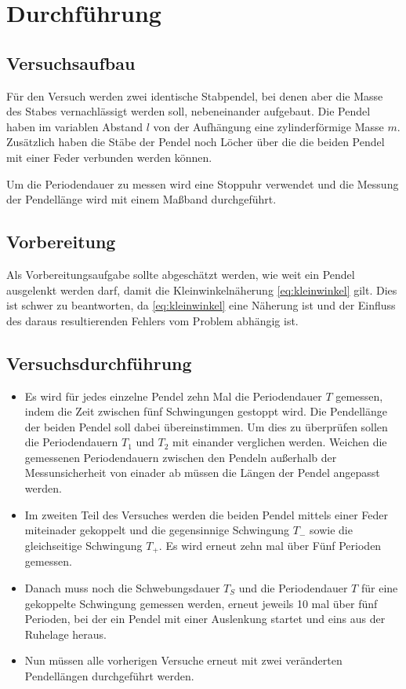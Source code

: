 \section{Durchführung}
\label{sec:Durchführung}
\subsection{Versuchsaufbau}
Für den Versuch werden zwei identische Stabpendel, bei denen aber die Masse des Stabes vernachlässigt werden soll, nebeneinander aufgebaut. Die Pendel haben im variablen Abstand $l$ von der Aufhängung eine zylinderförmige Masse $m$.
Zusätzlich haben die Stäbe der Pendel noch Löcher über die die beiden Pendel mit einer Feder verbunden werden können.

Um die Periodendauer zu messen wird eine Stoppuhr verwendet und die Messung der Pendellänge wird mit einem Maßband durchgeführt.
\subsection{Vorbereitung}
\label{sec:Vorbereitung}

Als Vorbereitungsaufgabe sollte abgeschätzt werden, wie weit ein Pendel ausgelenkt werden darf, damit die Kleinwinkelnäherung \eqref{eq:kleinwinkel}
gilt. Dies ist schwer zu beantworten, da \eqref{eq:kleinwinkel} eine Näherung ist und der Einfluss des daraus resultierenden Fehlers vom Problem abhängig ist.


\subsection{Versuchsdurchführung}
\begin{itemize}
    \item Es wird für jedes einzelne Pendel zehn Mal die Periodendauer $T$ gemessen, indem die Zeit zwischen fünf Schwingungen gestoppt wird. Die Pendellänge der beiden Pendel soll dabei übereinstimmen. Um dies zu überprüfen sollen die Periodendauern
        $T_1$ und $T_2$ mit einander verglichen werden. Weichen die gemessenen Periodendauern zwischen den Pendeln außerhalb der Messunsicherheit von einader ab müssen die Längen der Pendel angepasst werden.
    \item Im zweiten Teil des Versuches werden die beiden Pendel mittels einer Feder miteinader gekoppelt und die gegensinnige Schwingung $T_-$ sowie die gleichseitige Schwingung $T_+$. Es wird erneut zehn mal über Fünf Perioden gemessen.
    \item Danach muss noch die Schwebungsdauer $T_S$ und die Periodendauer $T$ für eine gekoppelte Schwingung gemessen werden, erneut jeweils 10 mal über fünf Perioden, bei der ein Pendel mit einer Auslenkung startet und eins aus der Ruhelage heraus.
    \item Nun müssen alle vorherigen Versuche erneut mit zwei veränderten Pendellängen durchgeführt werden.
\end{itemize}